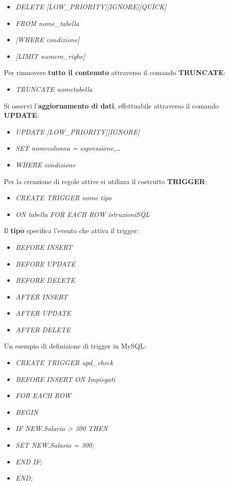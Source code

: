 \documentclass{article}
\begin{document}
\begin{itemize}[label={ }, leftmargin=1cm]
    \item \textit{DELETE [LOW\_PRIORITY][IGNORE][QUICK]}
    \item \textit{FROM nome\_tabella}
    \item \textit{[WHERE condizione]}
    \item \textit{[LIMIT numero\_righe]}
\end{itemize}
Per rimuovere \textbf{tutto il contenuto} attraverso il comando \textbf{TRUNCATE}:
\begin{itemize}[label={ }, leftmargin=1cm]
    \item \textit{TRUNCATE nometabella}
\end{itemize}
Si osservi l'\textbf{aggiornamento di dati}, effettuabile attraverso il comando \textbf{UPDATE}:
\begin{itemize}[label={ }, leftmargin=1cm]
    \item \textit{UPDATE [LOW\_PRIORITY][IGNORE]}
    \item \textit{SET nomecolonna = espressione,\dots}
    \item \textit{WHERE condizione}\\
\end{itemize}
Per la creazione di regole attive si utilizza il costrutto \textbf{TRIGGER}:
\begin{itemize}[label={ }, leftmargin=1cm]
    \item \textit{CREATE TRIGGER nome tipo}
    \item \textit{ON tabella FOR EACH ROW istruzioniSQL}
\end{itemize}
Il \textbf{tipo} specifica l'evento che attiva il trigger:
\begin{itemize}[label={ }, leftmargin=1cm]
    \item \textit{BEFORE INSERT}
    \item \textit{BEFORE UPDATE}
    \item \textit{BEFORE DELETE}
    \item \textit{AFTER INSERT}
    \item \textit{AFTER UPDATE}
    \item \textit{AFTER DELETE}
\end{itemize}
Un esempio di definizione di trigger in MySQL:
\begin{itemize}[label={ }, leftmargin=1cm]
    \item \textit{CREATE TRIGGER upd\_check}
    \item \textit{BEFORE INSERT ON Impiegati}
    \item \textit{FOR EACH ROW}
    \item \textit{BEGIN}
    \item \qquad\textit{IF NEW.Salario > 300 THEN}
    \item \qquad\qquad\textit{SET NEW.Salario = 300;}
    \item \qquad\textit{END IF;}
    \item \textit{END;}\\
\end{itemize}
\end{document}
